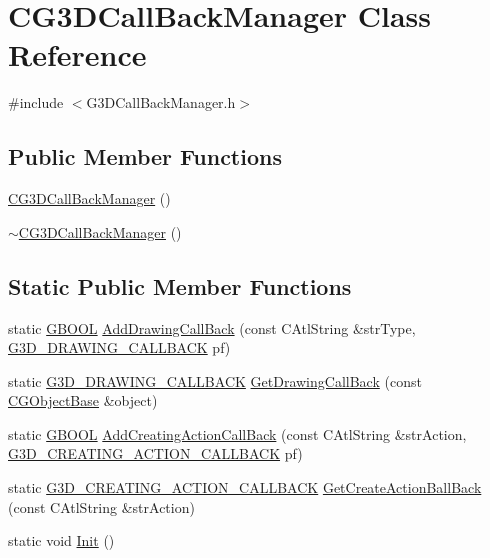 \hypertarget{class_c_g3_d_call_back_manager}{}\section{C\+G3\+D\+Call\+Back\+Manager Class Reference}
\label{class_c_g3_d_call_back_manager}


{\ttfamily \#include $<$G3\+D\+Call\+Back\+Manager.\+h$>$}

\subsection*{Public Member Functions}
\begin{DoxyCompactItemize}
\item 
\hyperlink{class_c_g3_d_call_back_manager_a3a0213bde4b185872e2411800a2df2ab}{C\+G3\+D\+Call\+Back\+Manager} ()
\item 
\hyperlink{class_c_g3_d_call_back_manager_ac8d0f97a588514bbdead997feda9c477}{$\sim$\+C\+G3\+D\+Call\+Back\+Manager} ()
\end{DoxyCompactItemize}
\subsection*{Static Public Member Functions}
\begin{DoxyCompactItemize}
\item 
static \hyperlink{_g_types_8h_a2901915743626352a6820c5405f556dc}{G\+B\+O\+O\+L} \hyperlink{class_c_g3_d_call_back_manager_ace8b80ddee8b0ad8fbc0d3c437825450}{Add\+Drawing\+Call\+Back} (const C\+Atl\+String \&str\+Type, \hyperlink{_g3_d_define_8h_ac489cc0b88dd30ebd45b785490bde03b}{G3\+D\+\_\+\+D\+R\+A\+W\+I\+N\+G\+\_\+\+C\+A\+L\+L\+B\+A\+C\+K} pf)
\item 
static \hyperlink{_g3_d_define_8h_ac489cc0b88dd30ebd45b785490bde03b}{G3\+D\+\_\+\+D\+R\+A\+W\+I\+N\+G\+\_\+\+C\+A\+L\+L\+B\+A\+C\+K} \hyperlink{class_c_g3_d_call_back_manager_a17e65df22907f01c695940a35f4eb42e}{Get\+Drawing\+Call\+Back} (const \hyperlink{class_c_g_object_base}{C\+G\+Object\+Base} \&object)
\item 
static \hyperlink{_g_types_8h_a2901915743626352a6820c5405f556dc}{G\+B\+O\+O\+L} \hyperlink{class_c_g3_d_call_back_manager_a1a7db89c6f37269f13d0b31894241b66}{Add\+Creating\+Action\+Call\+Back} (const C\+Atl\+String \&str\+Action, \hyperlink{_g3_d_define_8h_a42fa684f49ed06c9d585ec68c59948c0}{G3\+D\+\_\+\+C\+R\+E\+A\+T\+I\+N\+G\+\_\+\+A\+C\+T\+I\+O\+N\+\_\+\+C\+A\+L\+L\+B\+A\+C\+K} pf)
\item 
static \hyperlink{_g3_d_define_8h_a42fa684f49ed06c9d585ec68c59948c0}{G3\+D\+\_\+\+C\+R\+E\+A\+T\+I\+N\+G\+\_\+\+A\+C\+T\+I\+O\+N\+\_\+\+C\+A\+L\+L\+B\+A\+C\+K} \hyperlink{class_c_g3_d_call_back_manager_a353378e583262aafeeef0099d91bea83}{Get\+Create\+Action\+Ball\+Back} (const C\+Atl\+String \&str\+Action)
\item 
static void \hyperlink{class_c_g3_d_call_back_manager_a8da81546c67c9009590ffc4f24206496}{Init} ()
\end{DoxyCompactItemize}


